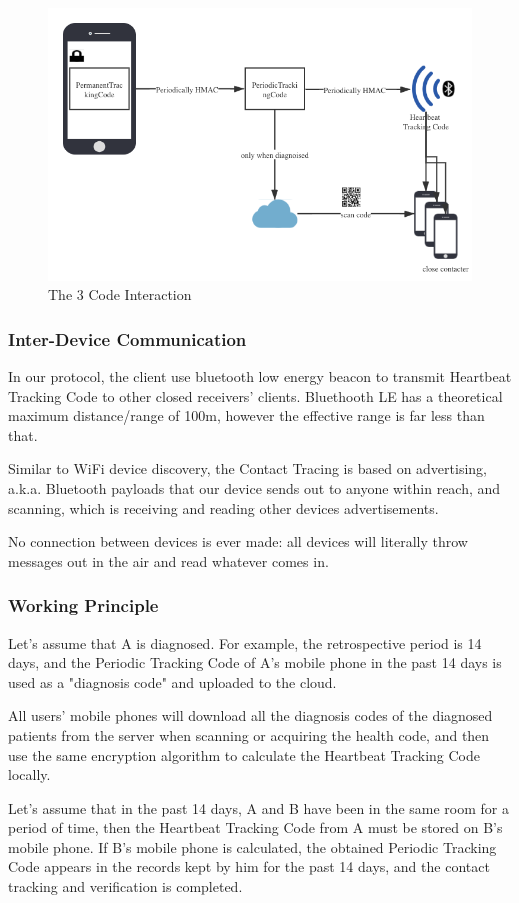 \documentclass[11pt,en]{elegantpaper}
\begin{document}
\begin{figure}[h]
	\centering
	\includegraphics[width=0.7\linewidth]{figure/3phasecode}
	\caption{The 3 Code Interaction}
	\label{fig:fig1}
\end{figure}


\subsubsection{Inter-Device Communication}
In our protocol, the client use bluetooth low energy beacon \cite{liao2020correction, panther2017adaptive}to transmit Heartbeat Tracking Code to other closed receivers' clients. Bluethooth LE has a theoretical maximum distance/range of 100m, however the effective range is far less than that.

Similar to WiFi device discovery, the Contact Tracing is based on advertising, a.k.a. Bluetooth payloads that our device sends out to anyone within reach, and scanning, which is receiving and reading other devices advertisements.

No connection between devices is ever made: all devices will literally throw messages out in the air and read whatever comes in.

\subsubsection{Working Principle}
Let's assume that A is diagnosed. For example, the retrospective period is 14 days, and the Periodic Tracking Code of A's mobile phone in the past 14 days is used as a "diagnosis code" and uploaded to the cloud.

All users' mobile phones will download all the diagnosis codes of the diagnosed patients from the server when scanning or acquiring the health code, and then use the same encryption algorithm to calculate the Heartbeat Tracking Code locally.

Let's assume that in the past 14 days, A and B have been in the same room for a period of time, then the Heartbeat Tracking Code from A must be stored on B's mobile phone. If B's mobile phone is calculated, the obtained Periodic Tracking Code appears in the records kept by him for the past 14 days, and the contact tracking and verification is completed.
\end{document}
